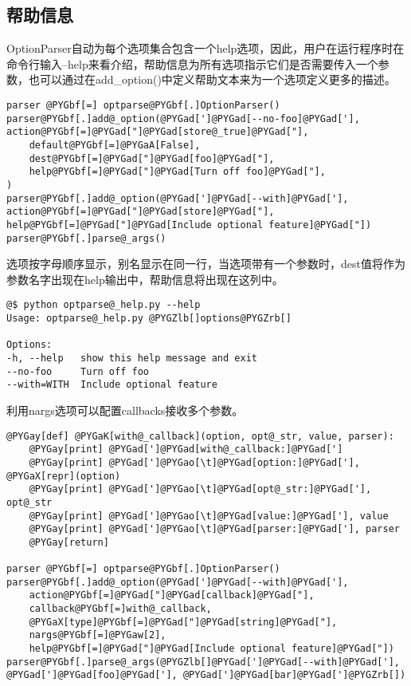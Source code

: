 \documentclass[letterpaper,10pt,english]{manual}
\begin{document}
\subsection{帮助信息}

OptionParser自动为每个选项集合包含一个help选项，因此，用户在运行程序时在命令行输入--help来看介绍，帮助信息为所有选项指示它们是否需要传入一个参数，也可以通过在add\_option()中定义帮助文本来为一个选项定义更多的描述。

\begin{Verbatim}[commandchars=@\[\]]
parser @PYGbf[=] optparse@PYGbf[.]OptionParser()
parser@PYGbf[.]add@_option(@PYGad[']@PYGad[--no-foo]@PYGad['], action@PYGbf[=]@PYGad["]@PYGad[store@_true]@PYGad["],
    default@PYGbf[=]@PYGaA[False],
    dest@PYGbf[=]@PYGad["]@PYGad[foo]@PYGad["],
    help@PYGbf[=]@PYGad["]@PYGad[Turn off foo]@PYGad["],
)
parser@PYGbf[.]add@_option(@PYGad[']@PYGad[--with]@PYGad['], action@PYGbf[=]@PYGad["]@PYGad[store]@PYGad["], help@PYGbf[=]@PYGad["]@PYGad[Include optional feature]@PYGad["])
parser@PYGbf[.]parse@_args()
\end{Verbatim}

选项按字母顺序显示，别名显示在同一行，当选项带有一个参数时，dest值将作为参数名字出现在help输出中，帮助信息将出现在这列中。

\begin{Verbatim}[commandchars=@\[\]]
@$ python optparse@_help.py --help
Usage: optparse@_help.py @PYGZlb[]options@PYGZrb[]

Options:
-h, --help   show this help message and exit
--no-foo     Turn off foo
--with=WITH  Include optional feature
\end{Verbatim}

利用nargs选项可以配置callbacks接收多个参数。

\begin{Verbatim}[commandchars=@\[\]]
@PYGay[def] @PYGaK[with@_callback](option, opt@_str, value, parser):
    @PYGay[print] @PYGad[']@PYGad[with@_callback:]@PYGad[']
    @PYGay[print] @PYGad[']@PYGao[\t]@PYGad[option:]@PYGad['], @PYGaX[repr](option)
    @PYGay[print] @PYGad[']@PYGao[\t]@PYGad[opt@_str:]@PYGad['], opt@_str
    @PYGay[print] @PYGad[']@PYGao[\t]@PYGad[value:]@PYGad['], value
    @PYGay[print] @PYGad[']@PYGao[\t]@PYGad[parser:]@PYGad['], parser
    @PYGay[return]

parser @PYGbf[=] optparse@PYGbf[.]OptionParser()
parser@PYGbf[.]add@_option(@PYGad[']@PYGad[--with]@PYGad['],
    action@PYGbf[=]@PYGad["]@PYGad[callback]@PYGad["],
    callback@PYGbf[=]with@_callback,
    @PYGaX[type]@PYGbf[=]@PYGad["]@PYGad[string]@PYGad["],
    nargs@PYGbf[=]@PYGaw[2],
    help@PYGbf[=]@PYGad["]@PYGad[Include optional feature]@PYGad["])
parser@PYGbf[.]parse@_args(@PYGZlb[]@PYGad[']@PYGad[--with]@PYGad['], @PYGad[']@PYGad[foo]@PYGad['], @PYGad[']@PYGad[bar]@PYGad[']@PYGZrb[])
\end{Verbatim}
\end{document}

